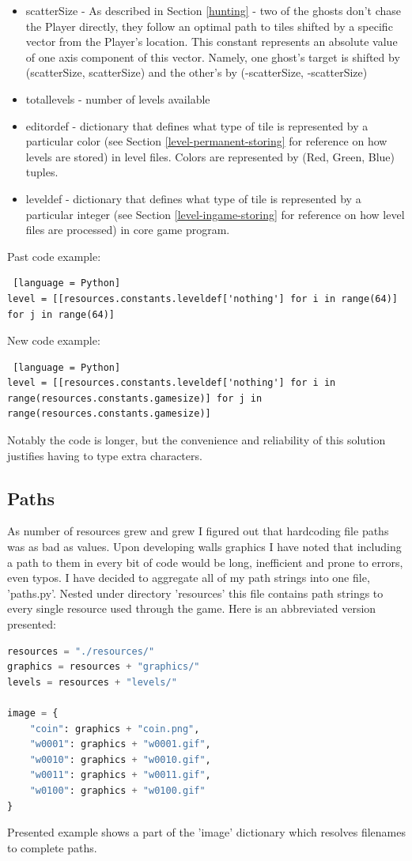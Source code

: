 \documentclass[11pt,a4paper,notitlepage]{report}
\newcommand{\dsubsection}[1]{\FloatBarrier \subsection{#1}}
\begin{document}
\begin{itemize}
					\item
						scatterSize - As described in Section \ref{hunting} - two of the ghosts don't chase the Player directly, they follow an optimal path to tiles shifted by a specific vector from the Player's location. This constant represents an absolute value of one axis component of this vector. Namely, one ghost's target is shifted by (scatterSize, scatterSize) and the other's by (-scatterSize, -scatterSize)
					\item
						totallevels - number of levels available
					\item
						editordef - dictionary that defines what type of tile is represented by a particular color (see Section \ref{level-permanent-storing} for reference on how levels are stored) in level files. Colors are represented by (Red, Green, Blue) tuples.
					\item
						leveldef - dictionary that defines what type of tile is represented by a particular integer (see Section \ref{level-ingame-storing} for reference on how level files are processed) in core game program.
				\end{itemize}
				Past code example:
				\begin{lstlisting} [language = Python]
level = [[resources.constants.leveldef['nothing'] for i in range(64)] for j in range(64)]
				\end{lstlisting}
				New code example:
				\begin{lstlisting} [language = Python]
level = [[resources.constants.leveldef['nothing'] for i in range(resources.constants.gamesize)] for j in range(resources.constants.gamesize)]
				\end{lstlisting}
				Notably the code is longer, but the convenience and reliability of this solution justifies having to type extra characters.
			\dsubsection{Paths}
				As number of resources grew and grew I figured out that hardcoding file paths was as bad as values. Upon developing walls graphics I have noted that including a path to them in every bit of code would be long, inefficient and prone to errors, even typos.
				I have decided to aggregate all of my path strings into one file, 'paths.py'. Nested under directory 'resources' this file contains path strings to every single resource used through the game.
				Here is an abbreviated version presented:
				\begin{lstlisting}[language=Python]
resources = "./resources/"
graphics = resources + "graphics/"
levels = resources + "levels/"

image = {
	"coin": graphics + "coin.png",
	"w0001": graphics + "w0001.gif",
	"w0010": graphics + "w0010.gif",
	"w0011": graphics + "w0011.gif",
	"w0100": graphics + "w0100.gif"
}
				\end{lstlisting}
				Presented example shows a part of the 'image' dictionary which resolves filenames to complete paths.
\end{document}
